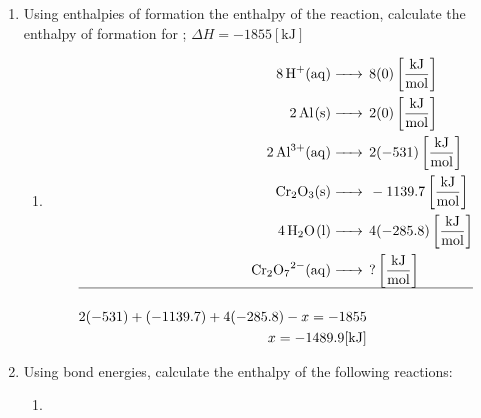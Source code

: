\documentclass[12pt]{article}
\begin{document}
\begin{enumerate}
\begin{enumerate}
    \end{enumerate}

  \item Using enthalpies of formation the enthalpy of the reaction, calculate the enthalpy of formation for ; $\Delta H=-1855[\si{\kilo\joule}]$

    \begin{enumerate}

      \item {}

        \begin{equation}
          \begin{split}
            \ce{8H+(aq) ->}&\,8(0)\left[ \frac{\si{\kilo\joule}}{\si{\mole}} \right]\\
          \ce{2Al(s) ->}&\,2(0)\left[ \frac{\si{\kilo\joule}}{\si{\mole}} \right]\\
          \ce{2Al^3+(aq) ->}&\,2(-531)\left[ \frac{\si{\kilo\joule}}{\si{\mole}} \right]\\
          \ce{Cr2O3(s) ->}&\,-1139.7\left[ \frac{\si{\kilo\joule}}{\si{\mole}} \right]\\
          \ce{4H2O(l) ->}&\,4(-285.8)\left[ \frac{\si{\kilo\joule}}{\si{\mole}} \right]\\
            \ce{Cr2O7^2-(aq) ->}&\,?\left[ \frac{\si{\kilo\joule}}{\si{\mole}} \right]\\
            \hline\\
            2(-531)+(-1139.7)+4(-285.8)-x=-1855\\
            x=-1489.9[\si{\kilo\joule}]
          \end{split}
          \label{3}
        \end{equation}

    \end{enumerate}

  \item Using bond energies, calculate the enthalpy of the following reactions:

    \begin{enumerate}

      \item {}


\end{enumerate}
\end{enumerate}
\end{document}

